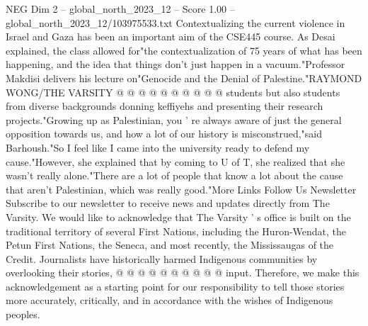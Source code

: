 \begin{textsample}{NEG Dim 2 – global\_north\_2023\_12 – Score 1.00 – global\_north\_2023\_12/103975533.txt}
Contextualizing the current violence in Israel and Gaza has been an important aim of the CSE445 course.
As Desai explained, the class allowed for"the contextualization of 75 years of what has been happening, and the idea that things don't just happen in a vacuum."Professor Makdisi delivers his lecture on"Genocide and the Denial of Palestine."RAYMOND WONG/THE VARSITY @ @ @ @ @ @ @ @ @ @ students but also students from diverse backgrounds donning keffiyehs and presenting their research projects."Growing up as Palestinian, you ' re always aware of just the general opposition towards us, and how a lot of our history is misconstrued,"said Barhoush."So I feel like I came into the university ready to defend my cause."However, she explained that by coming to U of T, she realized that she wasn't really alone."There are a lot of people that know a lot about the cause that aren't Palestinian, which was really good."More Links Follow Us Newsletter Subscribe to our newsletter to receive news and updates directly from The Varsity.
We would like to acknowledge that The Varsity ' s office is built on the traditional territory of several First Nations, including the Huron-Wendat, the Petun First Nations, the Seneca, and most recently, the Mississaugas of the Credit.
Journalists have historically harmed Indigenous communities by overlooking their stories, @ @ @ @ @ @ @ @ @ @ input.
Therefore, we make this acknowledgement as a starting point for our responsibility to tell those stories more accurately, critically, and in accordance with the wishes of Indigenous peoples.

\end{textsample}
